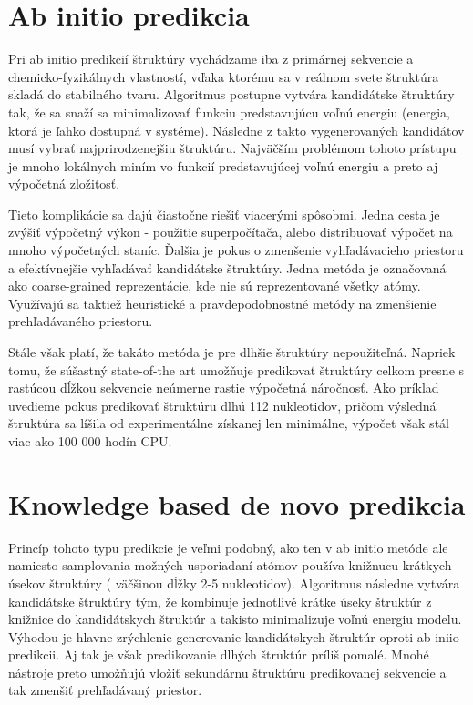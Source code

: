 \section{Ab initio predikcia}
Pri ab initio predikcií štruktúry vychádzame iba z primárnej sekvencie a chemicko-fyzikálnych vlastností, vďaka ktorému sa v reálnom svete štruktúra skladá do stabilného tvaru. Algoritmus postupne vytvára kandidátske štruktúry tak, že sa snaží sa minimalizovať funkciu predstavujúcu voľnú energiu (energia, ktorá je ľahko dostupná v systéme). Následne z takto vygenerovaných kandidátov musí vybrať najprirodzenejšiu štruktúru. Najväčším problémom tohoto prístupu je mnoho lokálnych miním vo funkcií predstavujúcej voľnú energiu a preto aj výpočetná zložitosť.


\indent  Tieto komplikácie sa dajú čiastočne riešiť viacerými spôsobmi. Jedna cesta je zvýšiť výpočetný výkon - použitie superpočítača, alebo distribuovať výpočet na mnoho výpočetných staníc. Ďalšia je pokus o zmenšenie vyhľadávacieho priestoru a efektívnejšie vyhľadávať kandidátske štruktúry. Jedna metóda je označovaná ako coarse-grained reprezentácie, kde nie sú reprezentované všetky atómy. Využívajú sa taktiež heuristické a pravdepodobnostné metódy na zmenšienie prehľadávaného priestoru.


\indent  Stále však platí, že takáto metóda je pre dlhšie štruktúry nepoužiteľná. Napriek tomu, že súšastný state-of-the art umožňuje predikovať štruktúry celkom presne s rastúcou dĺžkou sekvencie neúmerne rastie výpočetná náročnosť. Ako príklad uvedieme pokus predikovať štruktúru dlhú 112 nukleotidov, pričom výsledná štruktúra sa líšila od experimentálne získanej len minimálne, výpočet však stál viac ako 100 000 hodín CPU.  \cite{Qian2007}


\section{Knowledge based de novo predikcia}
Princíp tohoto typu predikcie je veľmi podobný, ako ten v ab initio metóde ale namiesto samplovania možných usporiadaní atómov používa knižnucu krátkych úsekov štruktúry ( väčšinou dĺžky 2-5 nukleotidov). Algoritmus následne vytvára kandidátske štruktúry tým, že kombinuje jednotlivé  krátke úseky štruktúr z knižnice do kandidátskych štruktúr a takisto minimalizuje voľnú energiu modelu. Výhodou je hlavne zrýchlenie generovanie kandidátskych štruktúr oproti ab iniio predikcii. Aj tak je však predikovanie dlhých štruktúr príliš pomalé. Mnohé nástroje preto umožňujú vložiť sekundárnu štruktúru predikovanej sekvencie a tak zmenšiť prehľadávaný priestor. 

